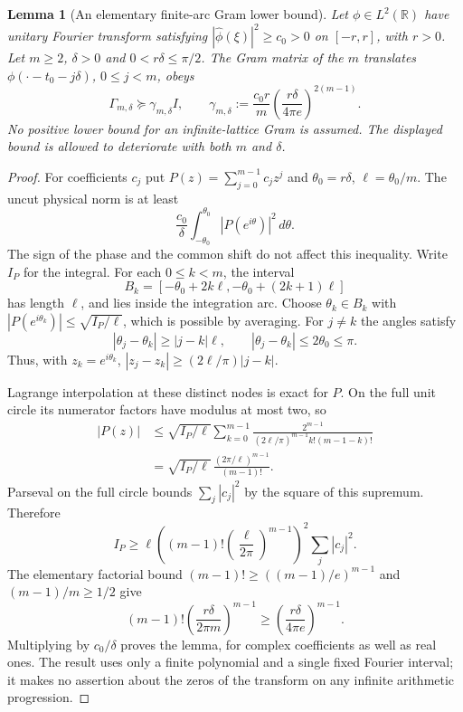 \documentclass[11pt]{article}
\newtheorem{lemma}[theorem]{Lemma}
\theoremstyle{remark}
\begin{document}
\begin{lemma}[An elementary finite-arc Gram lower bound]
\label{lem:ns46-finite-arc}
Let $\phi\in L^2(\mathbb R)$ have unitary Fourier transform satisfying
$|\widehat\phi(\xi)|^2\ge c_0>0$ on $[-r,r]$, with $r>0$.
Let $m\ge2$, $\delta>0$ and $0<r\delta\le\pi/2$.
The Gram matrix of the $m$ translates
$\phi(\cdot-t_0-j\delta)$, $0\le j<m$, obeys
\begin{equation}\label{eq:ns46-gram-bound}
 \Gamma_{m,\delta}\succeq\gamma_{m,\delta}I,
 \qquad
 \gamma_{m,\delta}:=\frac{c_0r}{m}
       \left(\frac{r\delta}{4\pi e}\right)^{2(m-1)}.
\end{equation}
No positive lower bound for an infinite-lattice Gram is assumed.
The displayed bound is allowed to deteriorate with both $m$ and $\delta$.
\end{lemma}
\begin{proof}
For coefficients $c_j$ put $P(z)=\sum_{j=0}^{m-1}c_jz^j$ and
$\theta_0=r\delta$, $\ell=\theta_0/m$. The uncut physical norm is at least
\[
 \frac{c_0}{\delta}\int_{-\theta_0}^{\theta_0}
                      |P(e^{i\theta})|^2\,d\theta.
\]
The sign of the phase and the common shift do not affect this inequality.
Write $I_P$ for the integral. For each $0\le k<m$, the interval
\[
 B_k=[-\theta_0+2k\ell,-\theta_0+(2k+1)\ell]
\]
has length $\ell$, and lies inside the integration arc. Choose
$\theta_k\in B_k$ with
$|P(e^{i\theta_k})|\le\sqrt{I_P/\ell}$, which is possible by averaging.
For $j\ne k$ the angles satisfy
\[
 |\theta_j-\theta_k|\ge |j-k|\ell,
 \qquad |\theta_j-\theta_k|\le2\theta_0\le\pi.
\]
Thus, with $z_k=e^{i\theta_k}$,
$|z_j-z_k|\ge(2\ell/\pi)|j-k|$.

Lagrange interpolation at these distinct nodes is exact for $P$.
On the full unit circle its numerator factors have modulus at most two,
so
\begin{align*}
 |P(z)|
 &\le\sqrt{I_P/\ell}
   \sum_{k=0}^{m-1}
   \frac{2^{m-1}}{(2\ell/\pi)^{m-1}k!(m-1-k)!}\\
 &=\sqrt{I_P/\ell}\,
   \frac{(2\pi/\ell)^{m-1}}{(m-1)!}.
\end{align*}
Parseval on the full circle bounds $\sum_j|c_j|^2$ by the square
of this supremum. Therefore
\[
 I_P\ge\ell
 \left((m-1)!\left(\frac{\ell}{2\pi}\right)^{m-1}\right)^2
 \sum_j|c_j|^2.
\]
The elementary factorial bound
$(m-1)!\ge((m-1)/e)^{m-1}$ and $(m-1)/m\ge1/2$ give
\[
 (m-1)!\left(\frac{r\delta}{2\pi m}\right)^{m-1}
 \ge\left(\frac{r\delta}{4\pi e}\right)^{m-1}.
\]
Multiplying by $c_0/\delta$ proves the lemma, for complex coefficients
as well as real ones. The result uses only a finite polynomial and a
single fixed Fourier interval; it makes no assertion about the zeros
of the transform on any infinite arithmetic progression.
\end{proof}
\end{document}
